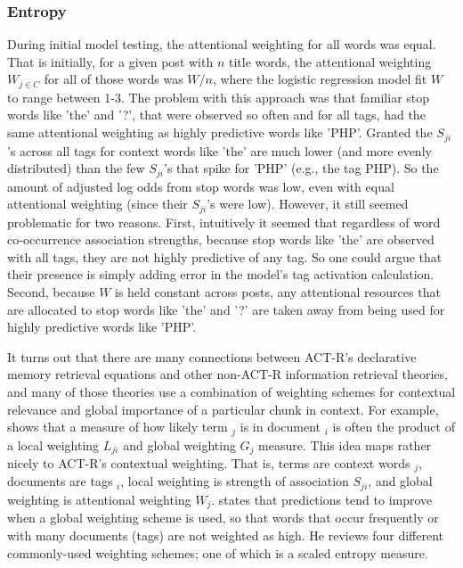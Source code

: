 \documentclass[10pt,letterpaper]{article}
\begin{document}
\subsubsection{Entropy}

During initial model testing, the attentional weighting for all words was equal.
That is initially, for a given post with $n$ title words, the attentional weighting $W_{j\in C}$ for all of those words was $W/n$, where the logistic regression model fit $W$ to range between 1-3.
The problem with this approach was that familiar stop words like 'the' and '?', that were observed so often and for all tags, had the same attentional weighting as highly predictive words like 'PHP'.
Granted the $S_{ji}$'s across all tags for context words like 'the' are much lower (and more evenly distributed) than the few $S_{ji}$'s that spike for 'PHP' (e.g., the tag PHP).
So the amount of adjusted log odds from stop words was low, even with equal attentional weighting (since their $S_{ji}$'s were low).
However, it still seemed problematic for two reasons.
First, intuitively it seemed that regardless of word co-occurrence association strengths, because stop words like 'the' are observed with all tags, they are not highly predictive of any tag.
So one could argue that their presence is simply adding error in the model's tag activation calculation.
Second, because $W$ is held constant across posts, any attentional resources that are allocated to stop words like 'the' and '?' are taken away from being used for highly predictive words like 'PHP'.

It turns out that there are many connections between ACT-R's declarative memory retrieval equations and other non-ACT-R information retrieval theories,
and many of those theories use a combination of weighting schemes for contextual relevance and global importance of a particular chunk in context.
For example,  shows that a measure of how likely term ${_j}$ is in document ${_i}$ is often the product of a local weighting $L_{ji}$ and global weighting $G_{j}$ measure.
This idea maps rather nicely to ACT-R's contextual weighting.
That is, terms are context words ${_j}$, documents are tags ${_i}$, local weighting is strength of association $S_{ji}$, and global weighting is attentional weighting $W_{j}$.
 states that predictions tend to improve when a global weighting scheme is used, so that words that occur frequently or with many documents (tags) are not weighted as high.
He reviews four different commonly-used weighting schemes; one of which is a scaled entropy measure.
\end{document}
